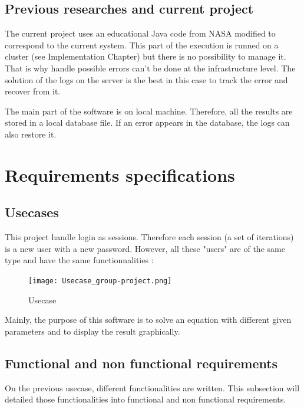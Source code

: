 \documentclass[10pt,a4paper]{report}
\begin{document}
	\section{Previous researches and current project}
The current project uses an educational Java code from NASA modified to correspond to the current system. This part of the execution is runned on a cluster (see Implementation Chapter) but there is no possibility to manage it. That is why handle possible errors can't be done at the infrastructure level. The solution of the logs on the server is the best in this case to track the error and recover from it. 

The main part of the software is on local machine. Therefore, all the results are stored in a local database file. If an error appears in the database, the logs can also restore it.



\chapter{Requirements specifications}
	\section{Usecases}
This project handle login as sessions. Therefore each session (a set of iterations) is a new user with a new password.  However, all these "users" are of the same type and have the same functionnalities : \\
\begin{figure}[h!]
\texttt{[image: Usecase\_group-project.png]}\\
\caption{Usecase}
\end{figure}


Mainly, the purpose of this software is to solve an equation with different given parameters and to display the result graphically.
	\section{Functional and non functional requirements}
On the previous usecase, different functionalities are written. This subsection will detailed those functionalities into functional and non functional requirements.
\end{document}
